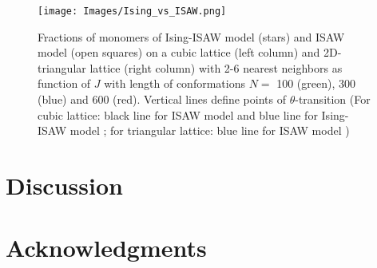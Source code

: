 \documentclass[a4paper]{jpconf}
\begin{document}
\begin{figure}
    \centering
    \texttt{[image: Images/Ising\_vs\_ISAW.png]}
    \caption{Fractions of monomers of Ising-ISAW model (stars) and ISAW model (open squares) on a cubic lattice (left column) and 2D-triangular lattice (right column) with 2-6 nearest neighbors as function of $J$ with length of conformations $N = $ 100 (green), 300 (blue) and 600 (red). Vertical lines define points of $\theta$-transition (For cubic lattice: black line for ISAW model \cite{Tesi1996} and blue line for Ising-ISAW model \cite{Foster2021}; for triangular lattice: blue line for ISAW model \cite{Privman1986})}
    \label{fig:Ising_vs_ISAW}
\end{figure}


\section{Discussion}

\section{Acknowledgments}

\newpage


\end{document}
